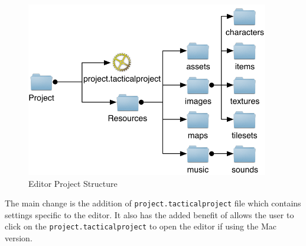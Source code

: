 \begin{figure}[htbp]
	\centering
		\includegraphics[height=3in]{figures/project.pdf}
	\caption{Editor Project Structure}
	\label{fig:figures_project}
\end{figure}

The main change is the addition of \texttt{project.tacticalproject} file which contains settings specific to the editor. It also has the added benefit of allows the user to click on the \texttt{project.tacticalproject} to open the editor if using the Mac version.